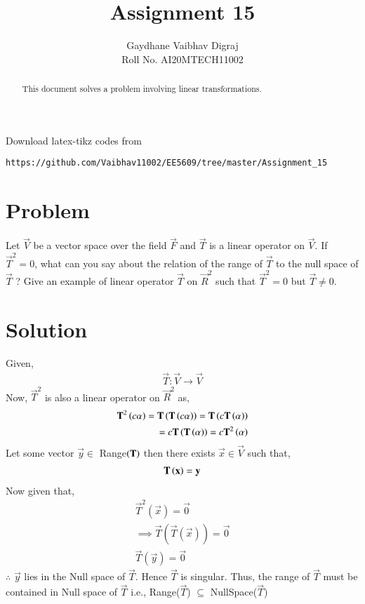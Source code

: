 \documentclass[journal,12pt,twocolumn]{IEEEtran}
\begin{document}
     \def\rightbox#1{\makebox[0in][r]{#1}}
     \def\centbox#1{\makebox[0in]{#1}}
     \def\topbox#1{\raisebox{-\baselineskip}[0in][0in]{#1}}
     \def\midbox#1{\raisebox{-0.5\baselineskip}[0in][0in]{#1}}
\vspace{3cm}
\title{Assignment 15}
\author{Gaydhane Vaibhav Digraj \\ Roll No. AI20MTECH11002}
\maketitle
\newpage
\bigskip
\renewcommand{\thefigure}{\theenumi}
\renewcommand{\thetable}{\theenumi}
\begin{abstract}
This document solves a problem involving linear transformations.
\end{abstract}
%
Download latex-tikz codes from 
%
\begin{lstlisting}
https://github.com/Vaibhav11002/EE5609/tree/master/Assignment_15
\end{lstlisting}
%
\section{Problem}
Let $\vec{V}$ be a vector space over the field $\vec{F}$ and $\vec{T}$ is a linear operator on $\vec{V}$. If $\vec{T}^2=0$, what can you say about the relation of the range of $\vec{T}$ to the null space of $\vec{T}$ ?
Give an example of linear operator $\vec{T}$ on $\vec{R}^2$ such that $\vec{T}^2=0$ but $\vec{T}\ne0$.

\section{Solution}
Given, 
\begin{align}
    \vec{T} : \vec{V} \xrightarrow{} \vec{V}
\end{align}
Now, $\vec{T}^2$ is also a linear operator on $\vec{R}^2$ as,
\begin{align}
    \mathbf{T}^2\left(c\alpha\right) = \mathbf{T}\left(\mathbf{T}\left(c\alpha\right)\right) = \mathbf{T}\left(c\mathbf{T}\left(\alpha\right)\right) \\
    = c\mathbf{T}\left(\mathbf{T}\left(\alpha\right)\right) = c\mathbf{T}^2\left(\alpha\right) 
\end{align}
Let some vector $\vec{y}\in $ Range$\left(\mathbf{T}\right)$ then there exists $\vec{x} \in \vec{V}$ such that,
\begin{align}
    \mathbf{T}\left(\mathbf{x}\right) = \mathbf{y}
\end{align}
Now given that,
\begin{align}
    \vec{T}^2(\vec{x}) = \vec{0} \\
    \implies \vec{T}(\vec{T}(\vec{x})) = \vec{0}\\
    \vec{T}(\vec{y}) = \vec{0}
\end{align}
$\therefore$ $\vec{y}$ lies in the Null space of $\vec{T}$. Hence $\vec{T}$ is singular. Thus, the range of $\vec{T}$ must be contained in Null space of $\vec{T}$ i.e.,
Range($\vec{T}$) $\subseteq$ NullSpace($\vec{T}$)
\end{document}
